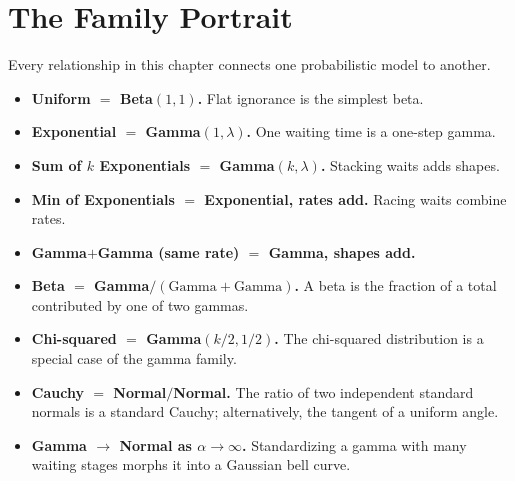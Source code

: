 \section{The Family Portrait}
\label{ch11:portrait}
Every relationship in this chapter connects one probabilistic model to another.
\begin{itemize}
  \item \textbf{Uniform $=$ Beta$(1,1)$.} Flat ignorance is the simplest beta.
  \item \textbf{Exponential $=$ Gamma$(1,\lambda)$.} One waiting time is a
    one-step gamma.
  \item \textbf{Sum of $k$ Exponentials $=$ Gamma$(k,\lambda)$.} Stacking waits
    adds shapes.
  \item \textbf{Min of Exponentials $=$ Exponential, rates add.} Racing waits
    combine rates.
  \item \textbf{Gamma$+$Gamma (same rate) $=$ Gamma, shapes add.}
  \item \textbf{Beta $=$ Gamma$/(\text{Gamma}+\text{Gamma})$.} A beta is the
    fraction of a total contributed by one of two gammas.
  \item \textbf{Chi-squared $=$ Gamma$(k/2,1/2)$.} The chi-squared distribution is a
    special case of the gamma family.
  \item \textbf{Cauchy $=$ Normal$/$Normal.} The ratio of two independent standard
    normals is a standard Cauchy; alternatively, the tangent of a uniform angle.
  \item \textbf{Gamma $\to$ Normal as $\alpha \to \infty$.} Standardizing a
    gamma with many waiting stages morphs it into a Gaussian bell curve.
\end{itemize}

